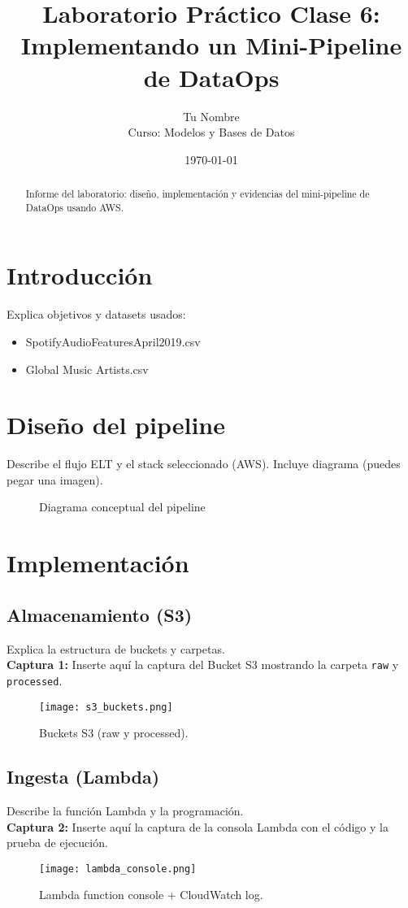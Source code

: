 \documentclass[11pt,a4paper]{article}
\title{Laboratorio Práctico Clase 6: Implementando un Mini-Pipeline de DataOps}
\author{Tu Nombre\\Curso: Modelos y Bases de Datos}
\date{\today}
\begin{document}
\maketitle
\begin{abstract}
Informe del laboratorio: diseño, implementación y evidencias del mini-pipeline de DataOps usando AWS.
\end{abstract}

\section{Introducción}
Explica objetivos y datasets usados:
\begin{itemize}
  \item SpotifyAudioFeaturesApril2019.csv
  \item Global Music Artists.csv
\end{itemize}

\section{Diseño del pipeline}
Describe el flujo ELT y el stack seleccionado (AWS). Incluye diagrama (puedes pegar una imagen).
\begin{figure}[H]
\centering
{}
\caption{Diagrama conceptual del pipeline}
\end{figure}

\section{Implementación}
\subsection{Almacenamiento (S3)}
Explica la estructura de buckets y carpetas. \\
\textbf{Captura 1:} Inserte aquí la captura del Bucket S3 mostrando la carpeta \texttt{raw} y \texttt{processed}.
\begin{figure}[H]
\centering
\texttt{[image: s3\_buckets.png]}
\caption{Buckets S3 (raw y processed).}
\end{figure}

\subsection{Ingesta (Lambda)}
Describe la función Lambda y la programación. \\
\textbf{Captura 2:} Inserte aquí la captura de la consola Lambda con el código y la prueba de ejecución.
\begin{figure}[H]
\centering
\texttt{[image: lambda\_console.png]}
\caption{Lambda function console + CloudWatch log.}
\end{figure}
\end{document}
